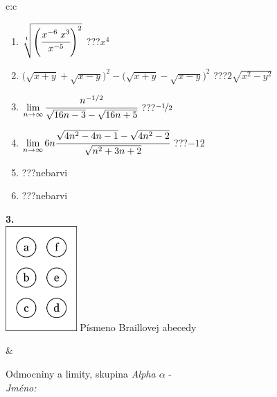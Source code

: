 \documentclass[10pt]{report}
\begin{document}
\begin{tabular}{c:c}
\begin{minipage}[c][104.5mm][t]{0.5\linewidth}
\begin{center}
\begin{minipage}{0.79\linewidth}
\begin{center}
\begin{varwidth}{\linewidth}
\begin{enumerate}
\small
\item $\sqrt[1]{\left(\cfrac{x^{-6}\;x^{3}}{x^{-5}}\right)^{2}}$\quad \dotfill\; ???\;\dotfill \quad $x^{4}$
\item {\footnotesize{\scriptsize$\big(\sqrt{x+y}+\sqrt{x-y}\big)^2-\big(\sqrt{x+y}-\sqrt{x-y}\big)^2$}\quad \dotfill\; ???\;\dotfill \quad $2\sqrt{x^2-y^2}$}
\item $\lim\limits_{n\to\infty}\cfrac{n^{-1/2}}{\sqrt{16n-3}-\sqrt{16n+5}}$\quad \dotfill\; ???\;\dotfill \quad $\nicefrac{-1}{2}$
\item $\lim\limits_{n\to\infty}6n\cfrac{\sqrt{4n^2-4n-1}-\sqrt{4n^2-2}}{\sqrt{n^2+3n+2}}$\quad \dotfill\; ???\;\dotfill \quad $-12$
\item \quad \dotfill\; ???\;\dotfill \quad nebarvi
\item \quad \dotfill\; ???\;\dotfill \quad nebarvi
\end{enumerate}
\end{varwidth}
\end{center}
\end{minipage}
\begin{minipage}{0.20\linewidth}
\begin{center}
{\Huge\bfseries 3.} \\[2mm]
\includegraphics[height=40mm]{../images/braille.png}
{\small Písmeno Braillovej abecedy}
\end{center}
\end{minipage}
\end{center}
\end{minipage}
&
\begin{minipage}[c][104.5mm][t]{0.5\linewidth}
\begin{center}
\vspace{7mm}
{\huge Odmocniny a limity, skupina \textit{Alpha $\alpha$} -}\\[5mm]
\textit{Jméno:}\phantom{xxxxxxxxxxxxxxxxxxxxxxxxxxxxxxxxxxxxxxxxxxxxxxxxxxxxxxxxxxxxxxxxx}\\[5mm]

\end{center}
\end{minipage}
\end{tabular}
\end{document}
